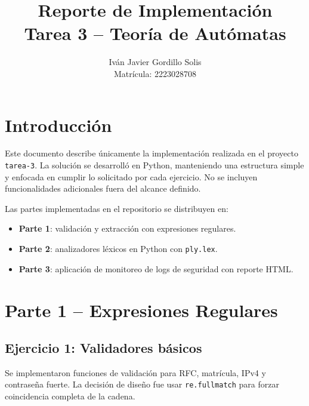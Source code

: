 \documentclass[12pt]{article}
\title{Reporte de Implementación\\Tarea 3 -- Teoría de Autómatas}
\author{Iván Javier Gordillo Solis\\Matrícula: 2223028708}
\date{}
\begin{document}
\maketitle

\section{Introducción}
Este documento describe únicamente la implementación realizada en el proyecto \texttt{tarea-3}.
La solución se desarrolló en Python, manteniendo una estructura simple y enfocada en cumplir lo solicitado por cada ejercicio.
No se incluyen funcionalidades adicionales fuera del alcance definido.

Las partes implementadas en el repositorio se distribuyen en:
\begin{itemize}[leftmargin=*]
    \item \textbf{Parte 1}: validación y extracción con expresiones regulares.
    \item \textbf{Parte 2}: analizadores léxicos en Python con \texttt{ply.lex}.
    \item \textbf{Parte 3}: aplicación de monitoreo de logs de seguridad con reporte HTML.
\end{itemize}

\section{Parte 1 -- Expresiones Regulares}

\subsection{Ejercicio 1: Validadores básicos}
Se implementaron funciones de validación para RFC, matrícula, IPv4 y contraseña fuerte.
La decisión de diseño fue usar \texttt{re.fullmatch} para forzar coincidencia completa de la cadena.
\end{document}
